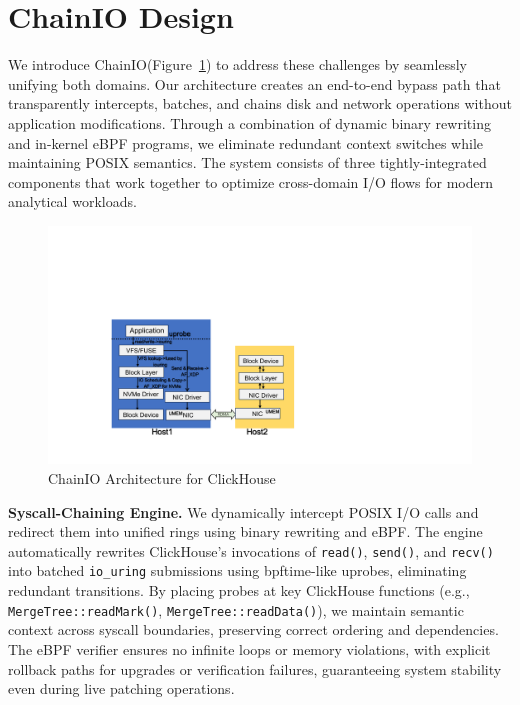 \documentclass[sigconf,10pt]{acmart}
\newcommand{\sys}{ChainIO\xspace}
\begin{document}
\section{\sys Design}\label{sec:design}

We introduce \sys (Figure~\ref{fig:bur}) to address these challenges by seamlessly unifying both domains. Our architecture creates an end-to-end bypass path that transparently intercepts, batches, and chains disk and network operations without application modifications. Through a combination of dynamic binary rewriting and in-kernel eBPF programs, we eliminate redundant context switches while maintaining POSIX semantics. The system consists of three tightly-integrated components that work together to optimize cross-domain I/O flows for modern analytical workloads.

\begin{figure}[h]
\centering
\includegraphics[width=\columnwidth]{img/bur.pdf}
\caption{\sys Architecture for ClickHouse}\label{fig:bur}
\end{figure}

\textbf{Syscall-Chaining Engine.} We dynamically intercept POSIX I/O calls and redirect them into unified rings using binary rewriting and eBPF. The engine automatically rewrites ClickHouse's invocations of \texttt{read()}, \texttt{send()}, and \texttt{recv()} into batched \texttt{io\_uring} submissions using bpftime-like uprobes, eliminating redundant transitions. By placing probes at key ClickHouse functions (e.g., \texttt{MergeTree::readMark()}, \texttt{MergeTree::readData()}), we maintain semantic context across syscall boundaries, preserving correct ordering and dependencies. The eBPF verifier ensures no infinite loops or memory violations, with explicit rollback paths for upgrades or verification failures, guaranteeing system stability even during live patching operations.
\end{document}

